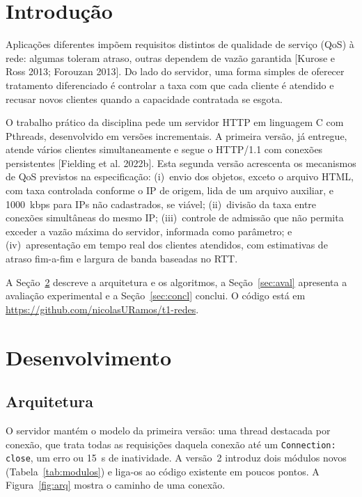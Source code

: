 \documentclass[12pt,a4paper]{article}
\begin{document}
\section{Introdução}

Aplicações diferentes impõem requisitos distintos de qualidade de serviço (QoS) à rede:
algumas toleram atraso, outras dependem de vazão garantida
[Kurose e Ross 2013; Forouzan 2013]. Do lado do servidor, uma forma simples de oferecer
tratamento diferenciado é controlar a taxa com que cada cliente é atendido e recusar
novos clientes quando a capacidade contratada se esgota.

O trabalho prático da disciplina pede um servidor HTTP em linguagem C com Pthreads,
desenvolvido em versões incrementais. A primeira versão, já entregue, atende vários
clientes simultaneamente e segue o HTTP/1.1 com conexões persistentes
[Fielding et al. 2022b]. Esta segunda versão acrescenta os mecanismos de QoS previstos
na especificação: (i)~envio dos objetos, exceto o arquivo HTML, com taxa controlada
conforme o IP de origem, lida de um arquivo auxiliar, e 1000~kbps para IPs não cadastrados,
se viável; (ii)~divisão da taxa entre conexões simultâneas do mesmo IP; (iii)~controle de
admissão que não permita exceder a vazão máxima do servidor, informada como parâmetro; e
(iv)~apresentação em tempo real dos clientes atendidos, com estimativas de atraso
fim-a-fim e largura de banda baseadas no RTT.

A Seção~\ref{sec:desenv} descreve a arquitetura e os algoritmos, a
Seção~\ref{sec:aval} apresenta a avaliação experimental e a Seção~\ref{sec:concl}
conclui. O código está em \url{https://github.com/nicolasURamos/t1-redes}.

\section{Desenvolvimento}\label{sec:desenv}

\subsection{Arquitetura}

O servidor mantém o modelo da primeira versão: uma thread destacada por conexão, que trata
todas as requisições daquela conexão até um \texttt{Connection: close}, um erro ou 15~s de
inatividade. A versão~2 introduz dois módulos novos (Tabela~\ref{tab:modulos}) e liga-os
ao código existente em poucos pontos. A Figura~\ref{fig:arq} mostra o caminho de uma conexão.
\end{document}
